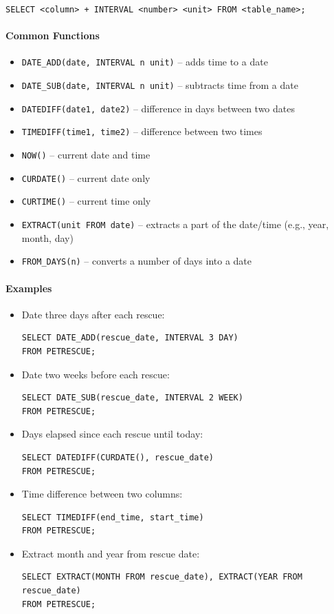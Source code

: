 \documentclass{article}
\begin{document}
\begin{FormulaBox}
\texttt{SELECT <column> + INTERVAL <number> <unit> FROM <table\_name>;}
\end{FormulaBox}
\paragraph{Common Functions}
\begin{itemize}
    \item \texttt{DATE\_ADD(date, INTERVAL n unit)} – adds time to a date
    \item \texttt{DATE\_SUB(date, INTERVAL n unit)} – subtracts time from a date
    \item \texttt{DATEDIFF(date1, date2)} – difference in days between two dates
    \item \texttt{TIMEDIFF(time1, time2)} – difference between two times
    \item \texttt{NOW()} – current date and time
    \item \texttt{CURDATE()} – current date only
    \item \texttt{CURTIME()} – current time only
    \item \texttt{EXTRACT(unit FROM date)} – extracts a part of the date/time (e.g., year, month, day)
    \item \texttt{FROM\_DAYS(n)} – converts a number of days into a date
\end{itemize}
\paragraph{Examples}
\begin{itemize}
    \item Date three days after each rescue:
\begin{verbatim}
SELECT DATE_ADD(rescue_date, INTERVAL 3 DAY)
FROM PETRESCUE;
\end{verbatim}

    \item Date two weeks before each rescue:
\begin{verbatim}
SELECT DATE_SUB(rescue_date, INTERVAL 2 WEEK)
FROM PETRESCUE;
\end{verbatim}

    \item Days elapsed since each rescue until today:
\begin{verbatim}
SELECT DATEDIFF(CURDATE(), rescue_date)
FROM PETRESCUE;
\end{verbatim}

    \item Time difference between two columns:
\begin{verbatim}
SELECT TIMEDIFF(end_time, start_time)
FROM PETRESCUE;
\end{verbatim}

    \item Extract month and year from rescue date:
\begin{verbatim}
SELECT EXTRACT(MONTH FROM rescue_date), EXTRACT(YEAR FROM rescue_date)
FROM PETRESCUE;
\end{verbatim}
\end{itemize}
\end{document}
